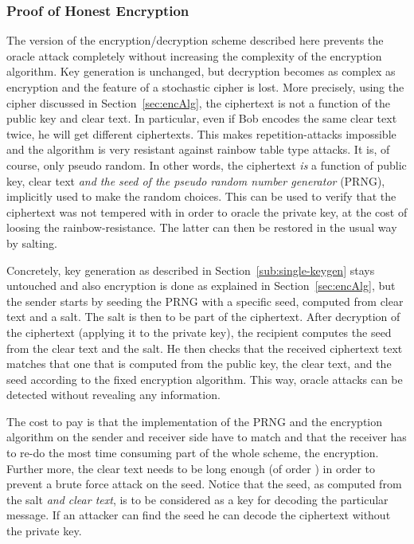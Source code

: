 \documentclass[final,journal,compsoc]{IEEEtran}
\begin{document}
\subsubsection{Proof of Honest Encryption\label{sec:honest}}

The version of the
encryption/decryption scheme described here  prevents the oracle attack
completely without increasing the complexity of the encryption
algorithm. Key generation is unchanged, but decryption becomes as
complex as encryption and the feature of a stochastic cipher is lost.
More precisely, using the cipher discussed in
Section~\ref{sec:encAlg}, the ciphertext is not a function of the public
key and clear text. In particular, even if Bob encodes the same clear
text twice, he will get different ciphertexts. This makes
repetition-attacks impossible and the algorithm is very
resistant against rainbow table type attacks. It is, of course,
only pseudo random. In other words, the ciphertext \emph{is} a function of
public key, clear text \emph{and the seed of the pseudo random number
  generator} (PRNG), implicitly used to make the random choices. This
can be used to verify that the ciphertext was not tempered with in order
to oracle the private key, at the cost of loosing the
rainbow-resistance. The latter can then be restored in the usual way
by salting.

Concretely, key generation as described in
Section~\ref{sub:single-keygen} stays untouched and also encryption is
done as explained in Section~\ref{sec:encAlg}, but the sender starts
by seeding the PRNG with a specific seed, computed from clear text and
a salt.  The salt is then to be part of the ciphertext.  
After decryption of the ciphertext (applying it to the private key), the
recipient computes the seed from the clear text and the salt. He then
checks that the received ciphertext text matches that one that is computed
from the public key, the clear text, and the seed according to the
fixed encryption algorithm.  This way, oracle attacks can be detected
without revealing any information. 

The cost to pay is that the
implementation of the PRNG and the encryption algorithm on the sender
and receiver side have to match and that the receiver has to
re-do the most time consuming part of the whole scheme, the
encryption.  Further more, the clear text needs to be long enough (of
order ) in order to prevent a brute force attack on the seed.
Notice that the seed, as computed from the salt \emph{and clear text},
is to be considered as a key for decoding the particular message. If
an attacker can find the seed he can decode the ciphertext without
the private key.
\end{document}
